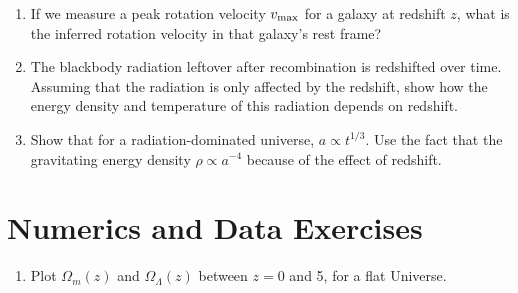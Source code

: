 \begin{enumerate}
\item If we measure a peak rotation velocity $v_{\rm  max}$ for a
galaxy at redshift $z$, what is the inferred rotation velocity in that
galaxy's rest frame?
\item The blackbody radiation leftover after recombination is redshifted over
time. Assuming that the radiation is only affected by the redshift,
show how the energy density and temperature of this radiation depends
on redshift.
\item Show that for a radiation-dominated universe, $a\propto
t^{1/3}$. Use the fact that the gravitating energy density
$\rho \propto a^{-4}$ because of the effect of redshift.
\end{enumerate}

\section{Numerics and Data Exercises}

\begin{enumerate}
\item Plot $\Omega_m(z)$ and $\Omega_\Lambda(z)$ between $z=0$ and 5,
for a flat Universe.
\end{enumerate}


  
